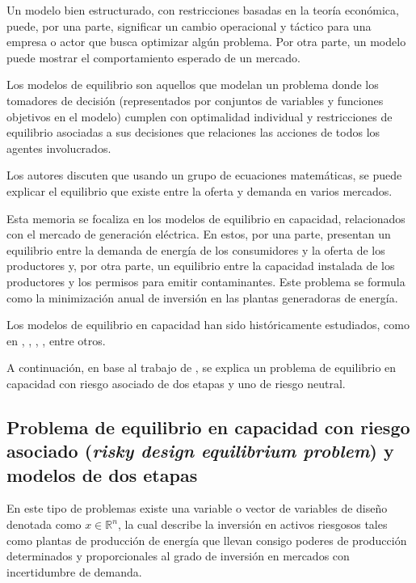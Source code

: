 Un modelo bien estructurado, con restricciones basadas en la teoría económica, puede, por una parte, significar un cambio operacional y táctico para una empresa o actor que busca optimizar algún problema. Por otra parte, un modelo puede mostrar el comportamiento esperado de un mercado.
\vspace{2.5mm}

Los modelos de equilibrio son aquellos que modelan un problema donde los tomadores de decisión (representados por conjuntos de variables y funciones objetivos en el modelo) cumplen con optimalidad individual y restricciones de equilibrio  asociadas a sus decisiones que relaciones las acciones de todos los agentes involucrados.
\vspace{2.5mm}

Los autores   discuten que usando un grupo de ecuaciones matemáticas, se puede explicar el equilibrio que existe entre la oferta y demanda en varios mercados.
\vspace{2.5mm}

Esta memoria se focaliza en los modelos de equilibrio en capacidad, relacionados con el mercado de generación eléctrica. En estos, por una parte, presentan un equilibrio entre la demanda de energía de los consumidores y la oferta de los productores y, por otra parte, un equilibrio entre la capacidad instalada de los productores y los permisos para emitir contaminantes. Este problema se formula como la minimización anual de inversión en las plantas generadoras de energía.
\vspace{2.5mm}

Los modelos de equilibrio en capacidad han sido históricamente estudiados, como en , , , , entre otros.
\vspace{2.5mm}

A continuación, en base al trabajo de , se explica un problema de equilibrio en capacidad con riesgo asociado de dos etapas y uno de riesgo neutral.

\subsection{Problema de equilibrio en capacidad con riesgo asociado (\textit{risky design equilibrium problem}) y modelos de dos etapas}

En este tipo de problemas existe una variable o vector de variables de diseño denotada como  $x \in \mathbb{R}^{n}$, la cual describe la inversión en activos riesgosos tales como plantas de producción de energía que llevan consigo poderes de producción determinados y proporcionales al grado de inversión en mercados con incertidumbre de demanda.
\vspace{2.5mm}

